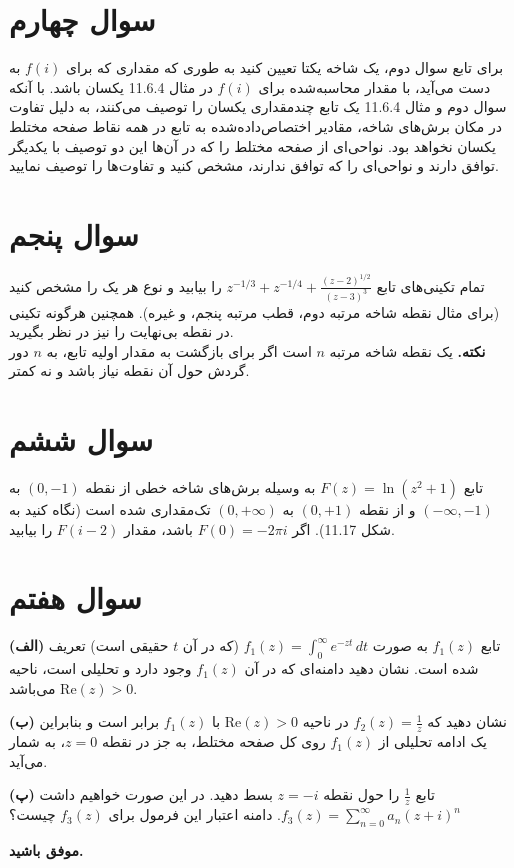 \documentclass[a4paper,16pt]{article}
\begin{document}
	
	\section{سوال چهارم}
برای تابع سوال دوم، یک شاخه یکتا تعیین کنید به طوری که مقداری که برای \( f(i) \) به دست می‌آید، با مقدار محاسبه‌شده برای \( f(i) \) در مثال 11.6.4 یکسان باشد. با آنکه سوال دوم و مثال 11.6.4 یک تابع چندمقداری یکسان را توصیف می‌کنند، به دلیل تفاوت در مکان برش‌های شاخه، مقادیر اختصاص‌داده‌شده به تابع در همه نقاط صفحه مختلط یکسان نخواهد بود. نواحی‌ای از صفحه مختلط را که در آن‌ها این دو توصیف با یکدیگر توافق دارند و نواحی‌ای را که توافق ندارند، مشخص کنید و تفاوت‌ها را توصیف نمایید.

	\section{سوال پنجم}
	تمام تکینی‌های تابع \( z^{-1/3} + z^{-1/4} + \frac{(z - 2)^{1/2}}{(z - 3)^3} \) را بیابید و نوع هر یک را مشخص کنید (برای مثال نقطه شاخه مرتبه دوم، قطب مرتبه پنجم، و غیره). همچنین هرگونه تکینی در نقطه بی‌نهایت را نیز در نظر بگیرید.
	\\
	\textbf{نکته.}
	یک نقطه شاخه مرتبه \( n \) است اگر برای بازگشت به مقدار اولیه تابع، به \( n \) دور گردش حول آن نقطه نیاز باشد و نه کمتر.
	
	\section{سوال ششم}
	
	تابع \( F(z) = \ln(z^2 + 1) \) به وسیله برش‌های شاخه خطی از نقطه \( (0,-1) \) به \( (-\infty,-1) \) و از نقطه \( (0,+1) \) به \( (0,+\infty) \) تک‌مقداری شده است (نگاه کنید به شکل 11.17). اگر \( F(0) = -2\pi i \) باشد، مقدار \( F(i - 2) \) را بیابید.
	\section{سوال هفتم}
	
	  \textbf{(الف)}
	تابع \( f_1(z) \) به صورت
	\( f_1(z) = \int_{0}^{\infty} e^{-zt}\, dt \)
	(که در آن \( t \) حقیقی است) تعریف شده است. نشان دهید دامنه‌ای که در آن \( f_1(z) \) وجود دارد و تحلیلی است، ناحیه \( \mathrm{Re}(z) > 0 \) می‌باشد.
	
	
	
	\textbf{(ب)}
	نشان دهید که \( f_2(z) = \frac{1}{z} \) در ناحیه \( \mathrm{Re}(z) > 0 \) با \( f_1(z) \) برابر است و بنابراین یک ادامه تحلیلی از \( f_1(z) \) روی کل صفحه مختلط، به جز در نقطه \( z = 0 \)، به شمار می‌آید.
	
	
	
	\textbf{(پ)}
	تابع \( \frac{1}{z} \) را حول نقطه \( z = -i \) بسط دهید. در این صورت خواهیم داشت
	\( f_3(z) = \sum_{n=0}^{\infty} a_n (z + i)^n \).
	دامنه اعتبار این فرمول برای \( f_3(z) \) چیست؟
	
	\vspace{10pt}
	\textbf{موفق باشید.}
\end{document}
